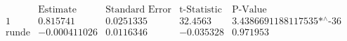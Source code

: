 \[\begin{array}{l|llll}
 \text{} & \text{Estimate} & \text{Standard Error} & \text{t-Statistic} & \text{P-Value} \\
\hline
 1 & 0.815741 & 0.0251335 & 32.4563 & \text{3.4386691188117535$\grave{ }$*${}^{\wedge}$-36} \\
 \text{runde} & -0.000411026 & 0.0116346 & -0.035328 & 0.971953 \\
\end{array}\]

